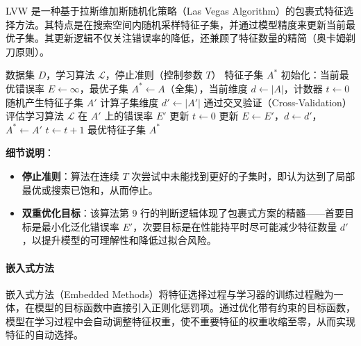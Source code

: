 \begin{example}
    LVW 是一种基于拉斯维加斯随机化策略（Las Vegas Algorithm）的包裹式特征选择方法。其特点是在搜索空间内随机采样特征子集，并通过模型精度来更新当前最优子集。其更新逻辑不仅关注错误率的降低，还兼顾了特征数量的精简（奥卡姆剃刀原则）。

    \begin{algorithm}[H]
    \caption{LVW (Las Vegas Wrapper) 算法流程}
    \begin{algorithmic}[1]
        \Require 数据集 $D$，学习算法 $\mathcal{L}$，停止准则（控制参数 $T$）
        \Ensure 特征子集 $A^*$
        \State 初始化：当前最优错误率 $E \gets \infty$，最优子集 $A^* \gets A$（全集），当前维度 $d \gets |A|$，计数器 $t \gets 0$
            \State 随机产生特征子集 $A'$
            \State 计算子集维度 $d' \gets |A'|$
            \State 通过交叉验证（Cross-Validation）评估学习算法 $\mathcal{L}$ 在 $A'$ 上的错误率 $E'$
             
                \State 更新 $t \gets 0$
                \State 更新 $E \gets E'$，$d \gets d'$，$A^* \gets A'$
            \Else
                \State $t \gets t + 1$ 
            \EndIf
        \EndWhile
        \State \Return 最优特征子集 $A^*$
    \end{algorithmic}
    \end{algorithm}

    \textbf{细节说明}：
    \begin{itemize}
        \item \textbf{停止准则}：算法在连续 $T$ 次尝试中未能找到更好的子集时，即认为达到了局部最优或搜索已饱和，从而停止。
        \item \textbf{双重优化目标}：该算法第 9 行的判断逻辑体现了包裹式方案的精髓——首要目标是最小化泛化错误率 $E'$，次要目标是在性能持平时尽可能减少特征数量 $d'$，以提升模型的可理解性和降低过拟合风险。
    \end{itemize}
\end{example}

\paragraph{嵌入式方法}嵌入式方法（Embedded Methods）将特征选择过程与学习器的训练过程融为一体，在模型的目标函数中直接引入正则化惩罚项。通过优化带有约束的目标函数，模型在学习过程中会自动调整特征权重，使不重要特征的权重收缩至零，从而实现特征的自动选择。

